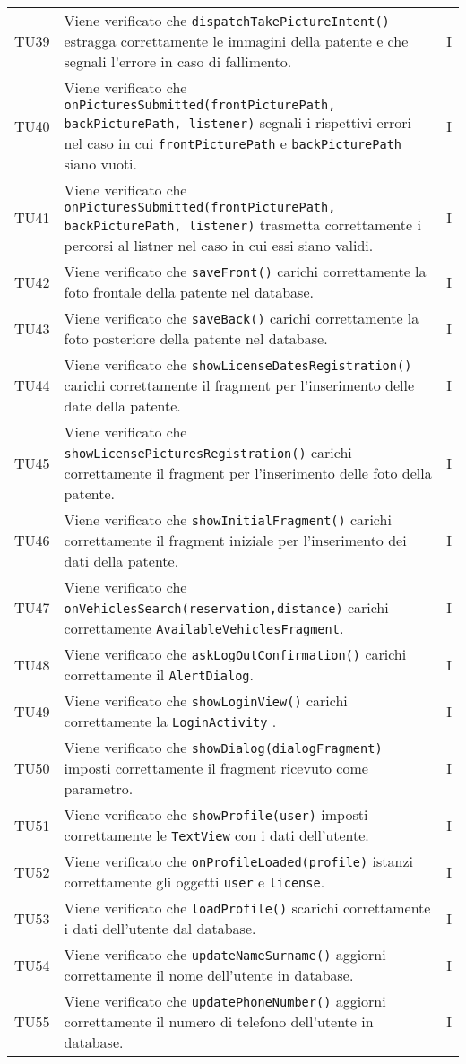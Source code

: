 \begin{longtable}{ >{\centering}p{}  >{\centering}p{} >{\centering}p{}
			}
		TU39 & Viene verificato che \texttt{dispatchTakePictureIntent()} estragga correttamente le immagini della patente e che segnali l'errore in caso di fallimento. & I 
		\tabularnewline	
		TU40 & Viene verificato che \texttt{onPicturesSubmitted(frontPicturePath, backPicturePath, listener)} segnali i rispettivi errori nel caso in cui \texttt{frontPicturePath} e \texttt{backPicturePath} siano vuoti. & I 
		\tabularnewline	
		TU41 & Viene verificato che \texttt{onPicturesSubmitted(frontPicturePath, backPicturePath, listener)} trasmetta correttamente i percorsi al listner nel caso in cui essi siano validi. & I 
		\tabularnewline	
		TU42 & Viene verificato che \texttt{saveFront()} carichi correttamente la foto frontale della patente nel database. & I 
		\tabularnewline	
		TU43 & Viene verificato che \texttt{saveBack()} carichi correttamente la foto posteriore della patente nel database. & I 
		\tabularnewline	
		TU44 & Viene verificato che \texttt{showLicenseDatesRegistration()} carichi correttamente il fragment per l'inserimento delle date della patente. & I 
		\tabularnewline	
		TU45 & Viene verificato che \texttt{showLicensePicturesRegistration()} carichi correttamente il fragment per l'inserimento delle foto della patente. & I
		\tabularnewline	
		TU46 & Viene verificato che \texttt{showInitialFragment()} carichi correttamente il fragment iniziale per l'inserimento dei dati della patente. & I 
		\tabularnewline	
		TU47 & Viene verificato che \texttt{onVehiclesSearch(reservation,distance)} carichi correttamente \texttt{AvailableVehiclesFragment}. & I 
		\tabularnewline	
		TU48 & Viene verificato che \texttt{askLogOutConfirmation()} carichi correttamente il \texttt{AlertDialog}. & I 
		\tabularnewline	
		TU49 & Viene verificato che \texttt{showLoginView()} carichi correttamente la \texttt{LoginActivity} . & I 
		\tabularnewline	
		TU50 & Viene verificato che \texttt{showDialog(dialogFragment)} imposti correttamente il fragment ricevuto come parametro. & I 
		\tabularnewline	
		TU51 & Viene verificato che \texttt{showProfile(user)} imposti correttamente le \texttt{TextView} con i dati dell'utente. & I 
		\tabularnewline	
		TU52 & Viene verificato che \texttt{onProfileLoaded(profile)} istanzi correttamente gli oggetti \texttt{user} e \texttt{license}. & I 
		\tabularnewline	
		TU53 & Viene verificato che \texttt{loadProfile()} scarichi correttamente i dati dell'utente dal database. & I 
		\tabularnewline	
		TU54 & Viene verificato che \texttt{updateNameSurname()} aggiorni correttamente il nome dell'utente in database. & I 
		\tabularnewline	
		TU55 & Viene verificato che \texttt{updatePhoneNumber()} aggiorni correttamente il numero di telefono dell'utente in database. & I 

\end{longtable}
